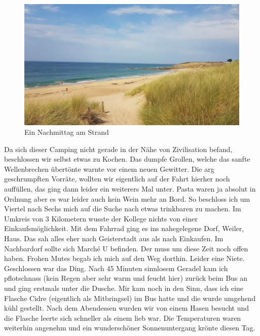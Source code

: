 \begin{figure}[H]
    \centering
    \includegraphics[width=\textwidth]{../Bilder/Bretagne/106.jpg}
    \caption{Ein Nachmittag am Strand}
    \label{img:Ein Nachmittag am Strand}
\end{figure}


Da sich dieser Camping nicht gerade in der Nähe von Zivilisation befand, beschlossen wir selbst etwas zu Kochen.
Das dumpfe Grollen, welche das sanfte Wellenbrechen übertönte warnte vor einem neuen Gewitter.
Die arg geschrumpften Vorräte, wollten wir eigentlich auf der Fahrt hierher noch auffüllen, das ging dann leider ein weiterers Mal unter.
Pasta waren ja absolut in Ordnung aber es war leider auch kein Wein mehr an Bord.
So beschloss ich um Viertel nach Sechs mich auf die Suche nach etwas trinkbaren zu machen.
Im Umkreis von 3 Kilometern wusste der Kollege nichts von einer Einkaufsmöglichkeit.
Mit dem Fahrrad ging es ins nahegelegene Dorf, Weiler, Haus.
Das sah alles eher nach Geisterstadt aus als nach Einkaufen.
Im Nachbardorf sollte sich Marché U befinden.
Der muss um diese Zeit noch offen haben.
Frohen Mutes begab ich mich auf den Weg dorthin.
Leider eine Niete.
Geschlossen war das Ding.
Nach 45 Minuten sinnlosem Geradel kam ich pflotschnass (kein Regen aber sehr warm und feucht hier) zurück beim Bus an und ging erstmals unter die Dusche.
Mir kam noch in den Sinn, dass ich eine Flasche Cidre (eigentlich als Mitbringsel) im Bus hatte und die wurde umgehend kühl gestellt.
Nach dem Abendessen wurden wir von einem Hasen besucht und die Flasche leerte sich schneller als einem lieb war.
Die Temperaturen waren weiterhin angenehm und ein wunderschöner Sonnenuntergang krönte diesen Tag.

